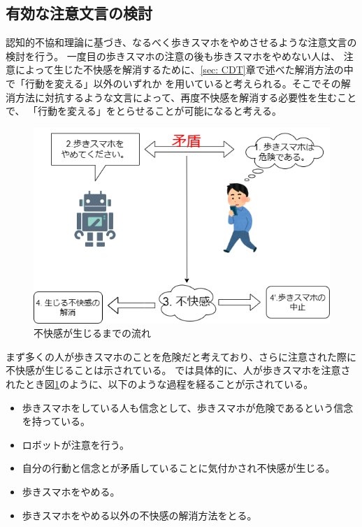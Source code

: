 \documentclass{kuisthesis}
\begin{document}
\subsection{有効な注意文言の検討}
認知的不協和理論に基づき、なるべく歩きスマホをやめさせるような注意文言の検討を行う。
一度目の歩きスマホの注意の後も歩きスマホをやめない人は、
注意によって生じた不快感を解消するために、\ref{sec: CDT}章で述べた解消方法の中で「行動を変える」以外のいずれか
を用いていると考えられる。そこでその解消方法に対抗するような文言によって、再度不快感を解消する必要性を生むことで、
「行動を変える」をとらせることが可能になると考える。
\label{sec: dissonance}
\begin{figure}[htbp]
  
  \includegraphics[width=13cm]{img/CDT.png}
  \caption{不快感が生じるまでの流れ}
  \label{fig: dissonance}
\end{figure}
まず多くの人が歩きスマホのことを危険だと考えており、さらに注意された際に不快感が生じることは示されている。
\cite{Schneider2022}では具体的に、人が歩きスマホを注意されたとき図\ref{fig: dissonance}のように、以下のような過程を経ることが示されている。
\begin{itemize}
  \item[(1)] 歩きスマホをしている人も信念として、歩きスマホが危険であるという信念を持っている。
  \item[(2)] ロボットが注意を行う。
  \item[(3)] 自分の行動と信念とが矛盾していることに気付かされ不快感が生じる。
  \item[(4)] 歩きスマホをやめる。
  \item[(4')]歩きスマホをやめる以外の不快感の解消方法をとる。
  \label{item: dissonance}
\end{itemize}
\end{document}
